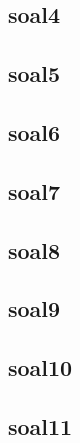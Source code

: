 \subsection{soal4}

\subsection{soal5}

\subsection{soal6}

\subsection{soal7}

\subsection{soal8}

\subsection{soal9}

\subsection{soal10}

\subsection{soal11}


